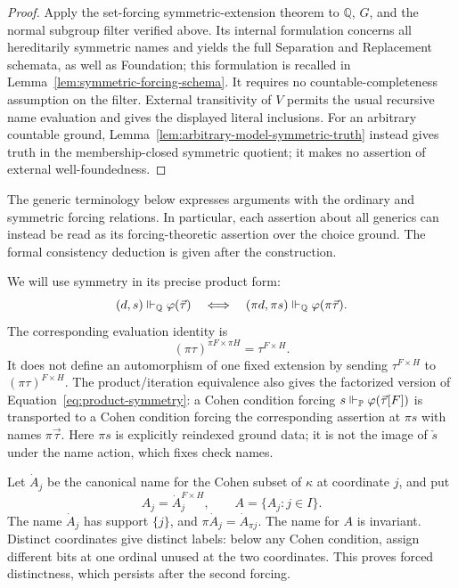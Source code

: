 \begin{proof}
Apply the set-forcing symmetric-extension theorem
\cite[Section~2.1, p.~4]{Karagila2026} to \(\mathbb Q\), \(G\),
and the normal subgroup filter verified above.
Its internal formulation concerns all hereditarily symmetric names
and yields the full Separation and Replacement schemata, as well as
Foundation; this formulation is recalled in
Lemma~\ref{lem:symmetric-forcing-schema}.  It requires no
countable-completeness assumption on the filter.  External transitivity
of \(V\) permits the usual recursive name evaluation and gives the
displayed literal inclusions.  For an arbitrary countable ground,
Lemma~\ref{lem:arbitrary-model-symmetric-truth} instead gives truth
in the membership-closed symmetric quotient; it makes no assertion
of external well-foundedness.
\end{proof}

The generic terminology below expresses arguments with the ordinary
and symmetric forcing relations.  In particular, each assertion about
all generics can instead be read as its forcing-theoretic assertion
over the choice ground.  The formal consistency deduction is given
after the construction.

We will use symmetry in its precise product form:
\begin{equation}\label{eq:product-symmetry}
 (d,s)\Vdash_{\mathbb Q}\varphi(\vec\tau)
 \quad\Longleftrightarrow\quad
 (\pi d,\pi s)\Vdash_{\mathbb Q}\varphi(\pi\vec\tau).
\end{equation}
The corresponding evaluation identity is
\[
 (\pi\tau)^{\pi F\times\pi H}=\tau^{F\times H}.
\]
It does not define an automorphism of one fixed extension by sending
\(\tau^{F\times H}\) to \((\pi\tau)^{F\times H}\).
The product/iteration equivalence also gives the factorized version
of Equation~\eqref{eq:product-symmetry}: a Cohen condition forcing
\(s\Vdash_{\mathbb P}\varphi(\vec\tau[F])\) is transported to a
Cohen condition forcing the corresponding assertion at \(\pi s\)
with names \(\pi\vec\tau\).
Here \(\pi s\) is explicitly reindexed ground data; it is not the
image of \(\check s\) under the name action, which fixes check names.

Let \(\dot A_j\) be the canonical name for the Cohen subset of
\(\kappa\) at coordinate \(j\), and put
\[
 A_j=\dot A_j^{F\times H},\qquad A=\{A_j:j\in I\}.
\]
The name \(\dot A_j\) has support \(\{j\}\), and
\(\pi\dot A_j=\dot A_{\pi j}\).
The name for \(A\) is invariant.  Distinct coordinates give distinct
labels: below any Cohen condition, assign different bits at one
ordinal unused at the two coordinates.  This proves forced
distinctness, which persists after the second forcing.

